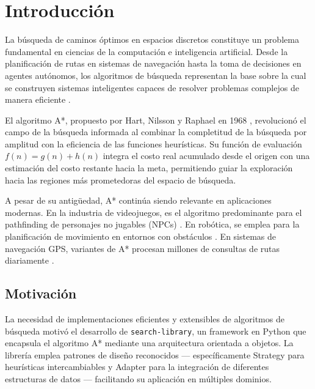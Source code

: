 \section{Introducción}

La búsqueda de caminos óptimos en espacios discretos constituye un problema fundamental en ciencias de la computación e inteligencia artificial. Desde la planificación de rutas en sistemas de navegación hasta la toma de decisiones en agentes autónomos, los algoritmos de búsqueda representan la base sobre la cual se construyen sistemas inteligentes capaces de resolver problemas complejos de manera eficiente \cite{russell2021artificial}.

El algoritmo A*, propuesto por Hart, Nilsson y Raphael en 1968 \cite{hart1968formal}, revolucionó el campo de la búsqueda informada al combinar la completitud de la búsqueda por amplitud con la eficiencia de las funciones heurísticas. Su función de evaluación $f(n) = g(n) + h(n)$ integra el costo real acumulado desde el origen con una estimación del costo restante hacia la meta, permitiendo guiar la exploración hacia las regiones más prometedoras del espacio de búsqueda.

A pesar de su antigüedad, A* continúa siendo relevante en aplicaciones modernas. En la industria de videojuegos, es el algoritmo predominante para el pathfinding de personajes no jugables (NPCs) \cite{millington2019ai}. En robótica, se emplea para la planificación de movimiento en entornos con obstáculos \cite{lavalle2006planning}. En sistemas de navegación GPS, variantes de A* procesan millones de consultas de rutas diariamente \cite{bast2016route}.

\subsection{Motivación}

La necesidad de implementaciones eficientes y extensibles de algoritmos de búsqueda motivó el desarrollo de \texttt{search-library}, un framework en Python que encapsula el algoritmo A* mediante una arquitectura orientada a objetos. La librería emplea patrones de diseño reconocidos --- específicamente Strategy para heurísticas intercambiables y Adapter para la integración de diferentes estructuras de datos --- facilitando su aplicación en múltiples dominios.

